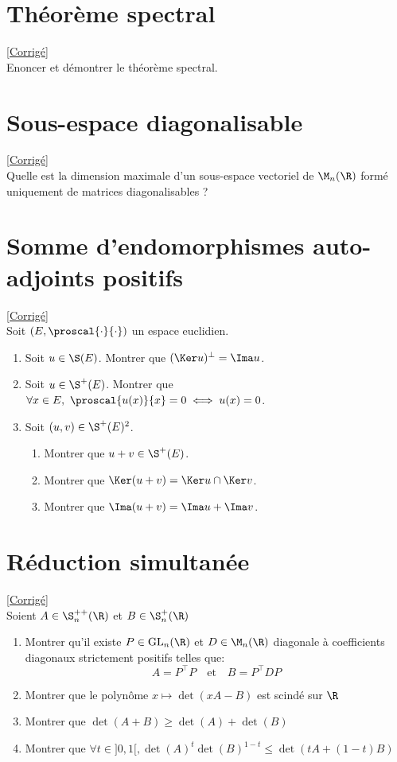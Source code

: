\documentclass[8pt]{book}
\begin{document}
\section{Théorème spectral }
\label{Théorème spectral}
\textcolor{blue}{\hyperref[Théorème spectral corrigé]{[Corrigé]}}\\
Enoncer et démontrer le théorème spectral.

\section{Sous-espace diagonalisable }
\label{Sous-espace diagonalisable}
\textcolor{blue}{\hyperref[Sous-espace diagonalisable corrigé]{[Corrigé]}}\\
Quelle est la dimension maximale d'un sous-espace vectoriel de $\M_n(\R)$ formé uniquement de matrices diagonalisables ?

\section{Somme d'endomorphismes auto-adjoints positifs}
\label{Somme d'endomorphismes auto-adjoints positifs}
\textcolor{blue}{\hyperref[Somme d'endomorphismes auto-adjoints positifs corrigé]{[Corrigé]}}\\
Soit $(E,\proscal{\cdot}{\cdot})$ un espace euclidien.
\begin{enumerate}
	\item Soit $u\in \S(E)$. Montrer que $(\Ker u)^\bot=\Ima u$.
	\item Soit $u\in \S^+(E)$. Montrer que $\forall x\in E,\ \proscal{u(x)}{x}=0\iff u(x)=0$.
	\item Soit $(u,v)\in \S^+(E)^2$.
	\begin{enumerate}[label=\alph*.]
		\item Montrer que $u+v\in \S^+(E)$.
		\item Montrer que $\Ker(u+v)=\Ker u\cap\Ker v$.
		\item Montrer que $\Ima(u+v)=\Ima u+\Ima v$.
	\end{enumerate}
\end{enumerate}

\section{Réduction simultanée }
\label{Réduction simultanée}
\textcolor{blue}{\hyperref[Réduction simultanée corrigé]{[Corrigé]}}\\
Soient $A\in \S^{++}_n(\R)$ et $B\in\S^+_n(\R)$
\begin{enumerate}
	\item Montrer qu'il existe $P\in \text{GL}_n(\R)$ et $D\in\M_n(\R)$ diagonale à coefficients diagonaux strictement positifs  telles que: $$A=P^\top P \quad \text{et} \quad B=P^\top DP$$
	\item Montrer que le polynôme $x\mapsto \det(xA-B)$ est scindé sur $\R$
	\item Montrer que $\det(A+B)\geq \det(A)+\det(B)$
	\item Montrer que $\forall t\in]0,1[, \det(A)^t\det(B)^{1-t}\leq \det(tA+(1-t)B)$
\end{enumerate}
\end{document}
